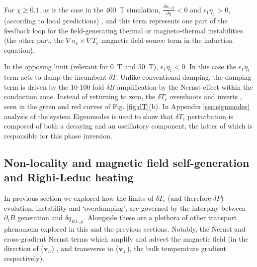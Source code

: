 \documentclass[aip,reprint]{revtex4-1}
\begin{document}
 For  $\chi \gtrsim 0.1$, as is the case in the \SI{400}{T} simulation,  $\frac{\partial \kappa_{\wedge,0}}{\partial \chi}<0$ and $\epsilon_1 \eta_1>0$, (according to local predictions) \cite{Epperlein1986}, and this term represents one part of the feedback loop for the field-generating thermal or magneto-thermal instabilities (the other part, the $\nabla n_e \times \nabla T_e$ magnetic field source term in the induction equation).

In the opposing limit (relevant for \SI{0}{T} and \SI{50}{T}), $\epsilon_1 \eta_1 < 0$. In this case the $\epsilon_1 \eta_1$ term acts to damp the incumbent $\delta T$. Unlike conventional damping, the damping term is driven by the 10-100 fold $\delta B$ amplification by the Nernst effect within the conduction zone. Instead of returning to zero, the $\delta T_e$  overshoots and inverts \cite{Hill2018}, seen in the green and red curves of Fig. \ref{fig:dT}(b).  In Appendix \ref{sec:eignmodes} analysis of the system Eigenmodes is used to show that $\delta T_e$ perturbation is composed of both a decaying and an oscillatory component, the latter of which is responsible for this phase inversion.

\subsection{Non-locality and magnetic field self-generation and Righi-Leduc heating }
\label{sec:biermann_and_qrl}
In previous section we explored how the limits of $\delta T_e$ (and therefore $\delta P$) evolution, instability and `overdamping', are governed by the interplay between $\partial_t B$ generation and $\delta q_{RL,y}$. Alongside these are a plethora of other transport phenomena explored in this and the previous sections. Notably, the Nernst and cross-gradient Nernst terms which amplify and advect the magnetic field (in the direction of ($\mathbf{v}_{\wedge}$) , and transverse to ($\mathbf{v}_{\perp}$), the bulk temperature gradient respectively). 
\end{document}
